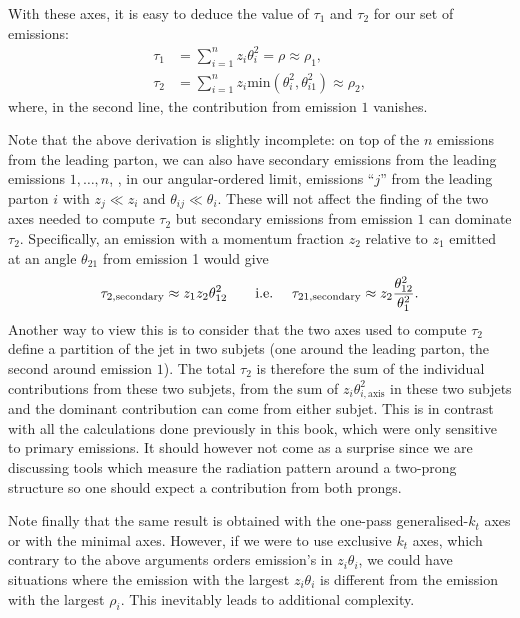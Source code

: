 With these axes, it is easy to deduce the value of
$\tau_1$ and $\tau_2$ for our set of emissions:
\begin{align}
\tau_1 & = \sum_{i=1}^n z_i\theta_i^2 = \rho \approx \rho_1,\\
\tau_2 & = \sum_{i=1}^n z_i\text{min}(\theta_i^2,\theta_{i1}^2) \approx \rho_2,\label{eq:tau2-LL-value}
\end{align}
where, in the second line, the contribution from emission $1$ vanishes.

Note that the above derivation is slightly incomplete: on top of the
$n$ emissions from the leading parton, we can also have secondary
emissions from the leading emissions $1,\dots,n$, \ie, in our
angular-ordered limit, emissions ``$j$'' from the leading parton $i$
with $z_j\ll z_i$ and $\theta_{ij}\ll\theta_i$.
%
These will not affect the finding of the two axes needed to compute
$\tau_2$ but secondary emissions from emission $1$ can dominate
$\tau_2$. Specifically, an emission with a momentum fraction $z_2$
relative to $z_1$ emitted at an angle $\theta_{21}$ from emission 1
would give
\begin{equation}\label{eq:tau21-value-secondary}
  \tau_{2,\text{secondary}} \approx z_1 z_2 \theta_{12}^2\qquad\text{i.e.\ }\quad
  \tau_{21,\text{secondary}} \approx z_2\frac{\theta_{12}^2}{\theta_1^2}.
\end{equation}
% 
Another way to view this is to consider that the two axes used to
compute $\tau_2$ define a partition of the jet in two subjets (one
around the leading parton, the second around emission $1$).
%
The total $\tau_2$ is therefore the sum of the individual
contributions from these two subjets, \ie from the sum of
$z_i\theta_{i,\text{axis}}^2$ in these two subjets and the dominant
contribution can come from either subjet.
%
This is in contrast with all the calculations done previously in this
book, which were only sensitive to primary emissions.
%
It should however not come as a surprise since we are discussing tools
which measure the radiation pattern around a two-prong structure so
one should expect a contribution from both prongs.

Note finally that the same result is obtained with the one-pass
generalised-$k_t$ axes or with the minimal axes. However, if we were
to use exclusive $k_t$ axes, which contrary to the above arguments
orders emission's in $z_i\theta_i$, we could have situations where the
emission with the largest $z_i\theta_i$ is different from the emission
with the largest $\rho_i$. This inevitably leads to additional complexity.


